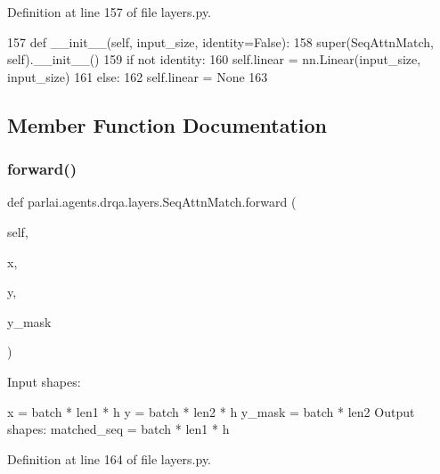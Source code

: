 Definition at line 157 of file layers.\+py.


\begin{DoxyCode}
157     \textcolor{keyword}{def }\_\_init\_\_(self, input\_size, identity=False):
158         super(SeqAttnMatch, self).\_\_init\_\_()
159         \textcolor{keywordflow}{if} \textcolor{keywordflow}{not} identity:
160             self.linear = nn.Linear(input\_size, input\_size)
161         \textcolor{keywordflow}{else}:
162             self.linear = \textcolor{keywordtype}{None}
163 
\end{DoxyCode}


\subsection{Member Function Documentation}
\mbox{\label{classparlai_1_1agents_1_1drqa_1_1layers_1_1SeqAttnMatch_ade14c6394d52f566a64da6573e8c913b}} 
\subsubsection{\texorpdfstring{forward()}{forward()}}
{\footnotesize\ttfamily def parlai.\+agents.\+drqa.\+layers.\+Seq\+Attn\+Match.\+forward (\begin{DoxyParamCaption}\item[{}]{self,  }\item[{}]{x,  }\item[{}]{y,  }\item[{}]{y\+\_\+mask }\end{DoxyParamCaption})}

\begin{DoxyVerb}Input shapes:

    x = batch * len1 * h
    y = batch * len2 * h
    y_mask = batch * len2
Output shapes:
    matched_seq = batch * len1 * h
\end{DoxyVerb}
 

Definition at line 164 of file layers.\+py.


